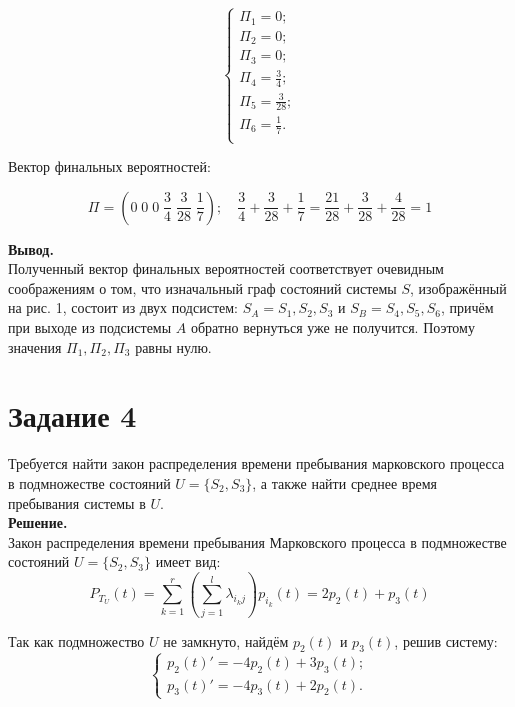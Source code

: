 \documentclass[14pt,a4paper]{scrartcl}
\begin{document}
\begin{equation*}
	\begin{cases}
		\Pi_1 = 0;\\
		\Pi_2 = 0;\\
		\Pi_3 = 0;\\
		\Pi_4 = \frac{3}{4};\\
		\Pi_5 = \frac{3}{28};\\
		\Pi_6 = \frac{1}{7}.\\
	\end{cases}
\end{equation*}

Вектор финальных вероятностей:

\begin{equation*}
	\Pi = (0 \; 0 \; 0 \; \frac{3}{4} \; \frac{3}{28} \; \frac{1}{7}); \quad \frac{3}{4} + \frac{3}{28} + \frac{1}{7} = \frac{21}{28} + \frac{3}{28} + \frac{4}{28} = 1
\end{equation*}

\textbf{Вывод.}\\
Полученный вектор финальных вероятностей соответствует очевидным соображениям о том, что изначальный граф состояний системы $S$, изображённый на рис. 1, состоит из двух подсистем: $S_A = {S_1, S_2, S_3}$ и $S_B = {S_4, S_5, S_6}$, причём при выходе из подсистемы $A$ обратно вернуться уже не получится. Поэтому значения $\Pi_1 , \Pi_2 , \Pi_3$ равны нулю.


\section*{Задание 4}
Требуется найти закон распределения времени пребывания марковского процесса в подмножестве состояний $U = \{S_2, S_3\}$, а также найти среднее время пребывания системы в $U$.\\

\textbf{Решение.}\\
Закон распределения времени пребывания Марковского процесса в подмножестве состояний $U = \{S_2,S_3\}$ имеет вид:
\begin{equation*}
	P_{T_{U}}(t)=\sum_{k=1}^{r}\left(\sum_{j=1}^{l} \lambda_{i_{k} j}\right) p_{i_{k}}(t)= 2p_2(t) + p_3(t)
\end{equation*}

Так как подмножество $U$ не замкнуто, найдём $p_2(t)$ и $p_3(t)$, решив систему:
\begin{equation*}
	\begin{cases}
		p_2(t)' = -4p_2(t) + 3p_3(t);\\
		p_3(t)' = -4p_3(t) + 2p_2(t).
	\end{cases}
\end{equation*}
\end{document}
